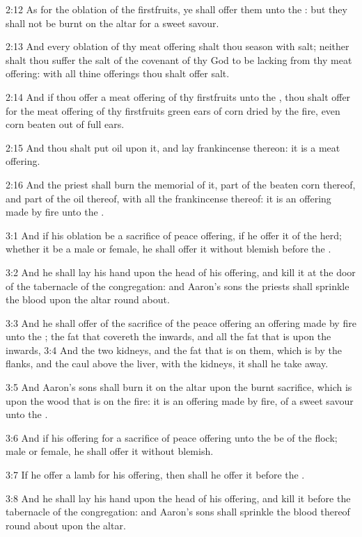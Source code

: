 2:12 As for the oblation of the firstfruits, ye shall offer them unto
the \LORD: but they shall not be burnt on the altar for a sweet savour.

2:13 And every oblation of thy meat offering shalt thou season with
salt; neither shalt thou suffer the salt of the covenant of thy God to
be lacking from thy meat offering: with all thine offerings thou shalt
offer salt.

2:14 And if thou offer a meat offering of thy firstfruits unto the
\LORD, thou shalt offer for the meat offering of thy firstfruits green
ears of corn dried by the fire, even corn beaten out of full ears.

2:15 And thou shalt put oil upon it, and lay frankincense thereon: it
is a meat offering.

2:16 And the priest shall burn the memorial of it, part of the beaten
corn thereof, and part of the oil thereof, with all the frankincense
thereof: it is an offering made by fire unto the \LORD.

3:1 And if his oblation be a sacrifice of peace offering, if he offer
it of the herd; whether it be a male or female, he shall offer it
without blemish before the \LORD.

3:2 And he shall lay his hand upon the head of his offering, and kill
it at the door of the tabernacle of the congregation: and Aaron's sons
the priests shall sprinkle the blood upon the altar round about.

3:3 And he shall offer of the sacrifice of the peace offering an
offering made by fire unto the \LORD; the fat that covereth the
inwards, and all the fat that is upon the inwards, 3:4 And the two
kidneys, and the fat that is on them, which is by the flanks, and the
caul above the liver, with the kidneys, it shall he take away.

3:5 And Aaron's sons shall burn it on the altar upon the burnt
sacrifice, which is upon the wood that is on the fire: it is an
offering made by fire, of a sweet savour unto the \LORD.

3:6 And if his offering for a sacrifice of peace offering unto the
\LORD be of the flock; male or female, he shall offer it without
blemish.

3:7 If he offer a lamb for his offering, then shall he offer it before
the \LORD.

3:8 And he shall lay his hand upon the head of his offering, and kill
it before the tabernacle of the congregation: and Aaron's sons shall
sprinkle the blood thereof round about upon the altar.

